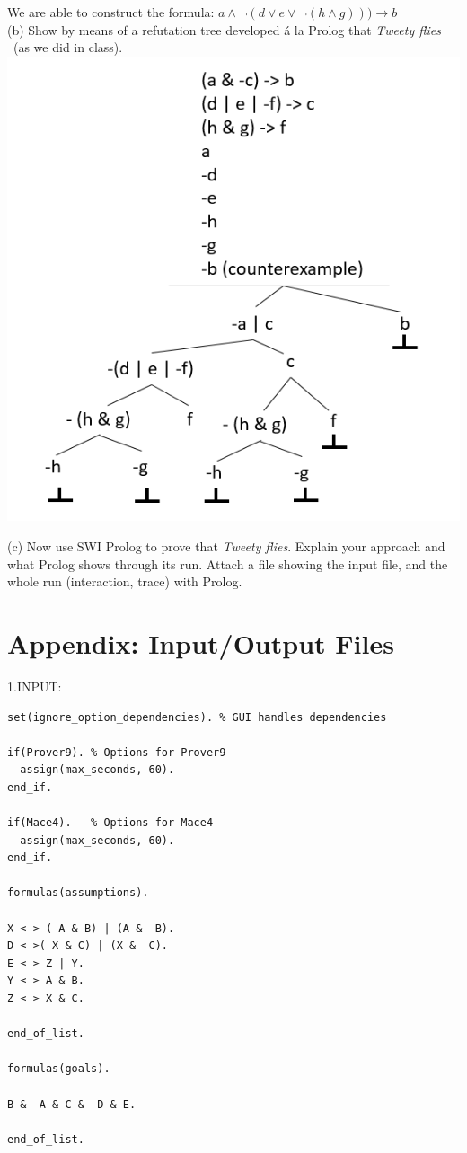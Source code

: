 \documentclass[fullpage]{article}
\begin{document}
We are able to construct the formula:
${a \wedge \neg(d \vee e \vee \neg (h \wedge g))) \rightarrow b}$\\

\noindent (b) Show by means of a refutation tree developed \'a la Prolog that  {\em Tweety flies} \ (as we did in class).\\

\includegraphics[scale=0.4]{cp}

(c) Now use SWI Prolog to prove that {\em Tweety flies}. Explain your approach and what Prolog shows through its run. Attach a file showing the input file, and the whole run (interaction, trace) with Prolog.  \\

\newpage
\section*{Appendix: Input/Output Files}
1.INPUT:

 {\footnotesize \begin{verbatim}
set(ignore_option_dependencies). % GUI handles dependencies

if(Prover9). % Options for Prover9
  assign(max_seconds, 60).
end_if.

if(Mace4).   % Options for Mace4
  assign(max_seconds, 60).
end_if.

formulas(assumptions).

X <-> (-A & B) | (A & -B).
D <->(-X & C) | (X & -C).
E <-> Z | Y.
Y <-> A & B.
Z <-> X & C.

end_of_list.

formulas(goals).

B & -A & C & -D & E.

end_of_list.


\end{verbatim} }
\end{document}
